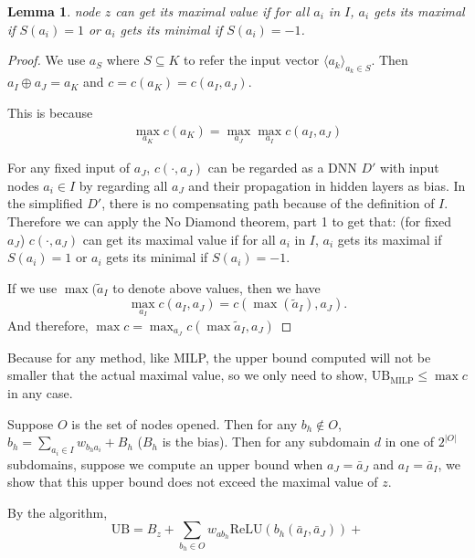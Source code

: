 \documentclass[]{article}
\newtheorem{lemma}{Lemma}
\theoremstyle{definition}
\newcommand{\ReLU}{\mathrm{ReLU}}
\begin{document}
\begin{lemma}
	node $z$ can get its maximal value if for all $a_i$ in $I$, $a_i$ gets its maximal if $S(a_i)=1$ or $a_i$ gets its minimal if $S(a_i)=-1$.
\end{lemma}

\begin{proof}
	
	We use $a_S$ where $S\subseteq K$ to refer the input vector $\langle a_k\rangle_{a_k\in S}$. Then $a_I\oplus a_J = a_K$ and $c=c(a_K)=c(a_I,a_J)$.
	
	This is because \begin{align*}
		\max_{a_K} c(a_K) = \max_{a_J}\max_{a_I} c(a_I,a_J)
	\end{align*}
	
	For any fixed input of $a_J$, $c(\cdot, a_J)$ can be regarded as a DNN $D'$ with input nodes $a_i\in I$ by regarding all $a_J$ and their propagation in hidden layers as bias. In the simplified $D'$, there is no compensating path because of the definition of $I$. Therefore we can apply the No Diamond theorem, part 1 to get that: (for fixed $a_J$) $c(\cdot,a_J)$ can get its maximal value if for all $a_i$ in $I$, $a_i$ gets its maximal if $S(a_i)=1$ or $a_i$ gets its minimal if $S(a_i)=-1$.
	
	If we use $\max(\tilde{a}_I$ to denote above values, then we have $$\max_{a_I}c(a_I,a_J)=c(\max(\tilde{a}_I),a_J).$$ And therefore, $\max c=\max_{a_J} c(\max\tilde{a}_I,a_J)$
\end{proof}


Because for any method, like MILP, the upper bound computed will not be smaller that the actual maximal value, so we only need to show, $\mathrm{UB}_{\mathrm{MILP}}\leq \max c$ in any case.

Suppose $O$ is the set of nodes opened. Then for any $b_h\notin O$, $b_h=\sum_{a_i\in I}w_{b_ha_i}+B_h$ ($B_h$ is the bias). Then for any subdomain $d$ in one of  $2^{|O|}$ subdomains, suppose we compute an upper bound when $a_J=\bar{a}_J$ and $a_I=\bar{a}_I$, we show that this upper bound does not exceed the maximal value of $z$. 

By the algorithm, $$\mathrm{UB} = B_z+\sum_{b_h\in O}w_{ab_h}\ReLU(b_h(\bar{a}_I,\bar{a}_J))+$$
\end{document}
